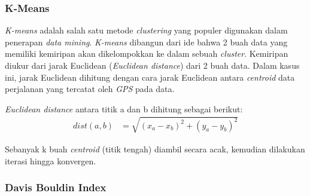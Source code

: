\documentclass{article}
\begin{document}
\subsubsection{K-Means}
\begin{adjustwidth}{4em}{0pt}

\hspace{\parindent}\textit{K-means} adalah salah satu metode \textit{clustering} yang populer digunakan dalam penerapan \textit{data mining}. \textit{K-means} dibangun dari ide bahwa 2 buah data yang memiliki kemiripan akan dikelompokkan ke dalam sebuah \textit{cluster}. Kemiripan diukur dari jarak Euclidean (\textit{Euclidean distance}) dari 2 buah data. Dalam kasus ini, jarak Euclidean dihitung dengan cara jarak Euclidean antara \textit{centroid} data perjalanan yang tercatat oleh \textit{GPS} pada data.

\textit{Euclidean distance} antara titik a dan b dihitung sebagai berikut:
\begin{align*}
	dist(a,b) &= \sqrt{(x_{a} - x_{b})^2 + (y_{a} - y_{b})^2}
\end{align*}

Sebanyak k buah \textit{centroid} (titik tengah) diambil secara acak, kemudian dilakukan iterasi hingga konvergen. 

\end{adjustwidth}

\subsubsection{Davis Bouldin Index}
\end{document}
